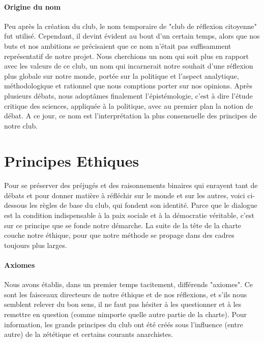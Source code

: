 \documentclass[a4paper,12pt]{article}
\begin{document}
\paragraph{Origine du nom}
Peu après la création du club, le nom temporaire de "club de réflexion citoyenne" fut utilisé. Cependant, il devint évident au bout d'un certain temps, alors que nos buts et nos ambitions se précisaient que ce nom n'était pas suffisamment représentatif de notre projet. Nous cherchions un nom qui soit plus en rapport avec les valeurs de ce club, un nom qui incarnerait notre souhait d'une réflexion plus globale sur notre monde, portée sur la politique et l'aspect analytique, méthodologique et rationnel que nous comptions porter sur nos opinions. Après plusieurs débats, nous adoptâmes finalement l'épistémologie, c'est à dire l'étude critique des sciences, appliquée à la politique, avec au premier plan la notion de débat. A ce jour, ce nom est l'interprétation la plus consensuelle des principes de notre club.
  
\section{Principes Ethiques}
\paragraph{} 
Pour se préserver des préjugés et des raisonnements binaires qui enrayent tant de débats et pour donner matière à réfléchir sur le monde et sur les autres, voici ci-dessous les règles de base du club, qui fondent son identité. Parce que le dialogue est la condition indispensable à la paix sociale et à la démocratie véritable, c'est sur ce principe que se fonde notre démarche. La suite de la tête de la charte couche notre éthique, pour que notre méthode se propage dans des cadres toujours plus larges.

\paragraph{Axiomes}
Nous avons établis, dans un premier temps tacitement, différends "axiomes". Ce sont les faisceaux directeurs de notre éthique et de nos réflexions, et s'ils nous semblent relever du bon sens, il ne faut pas hésiter à les questionner et à les remettre en question (comme nimporte quelle autre partie de la charte). Pour information, les grands principes du club ont été créés sous l'influence (entre autre) de la zététique et certains courants anarchistes.
\end{document}
